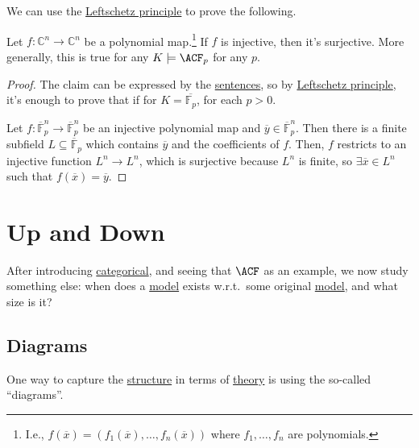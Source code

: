 We can use the \hyperref[thm:Leftschetz-principle]{Leftschetz principle} to prove the following.

\begin{theorem}\label{thm:Ax-Grothendieck}
	Let \(f\colon \mathbb{C} ^n \to \mathbb{C} ^n\) be a polynomial map.\footnote{I.e., \(f(\overline{x} ) = (f_1(\overline{x} ), \ldots , f_n(\overline{x} ))\) where \(f_1, \ldots , f_n\) are polynomials.} If \(f\) is injective, then it's surjective. More generally, this is true for any \(K \models \ACF_p\) for any \(p\).
\end{theorem}
\begin{proof}
	The claim can be expressed by the \hyperref[def:sentence]{sentences}, so by \hyperref[thm:Leftschetz-principle]{Leftschetz principle}, it's enough to prove that if for \(K = \overline{\mathbb{F}_p}\), for each \(p > 0\).

	Let \(f\colon \overline{\mathbb{F}}_p^n \to \overline{\mathbb{F}}_p^n\) be an injective polynomial map and \(\overline{y} \in \overline{\mathbb{F}}_p^n\). Then there is a finite subfield \(L \subseteq \overline{\mathbb{F}} _p \) which contains \(\overline{y}\) and the coefficients of \(f\). Then, \(f\) restricts to an injective function \(L^n \to L^n\), which is surjective because \(L^n\) is finite, so \(\exists \overline{x} \in L^n\) such that \(f(\overline{x} ) = \overline{y} \).
\end{proof}

\section{Up and Down}
After introducing \hyperref[def:categorical]{categorical}, and seeing that \(\ACF\) as an example, we now study something else: when does a \hyperref[def:model]{model} exists w.r.t.\ some original \hyperref[def:model]{model}, and what size is it?

\subsection{Diagrams}
One way to capture the \hyperref[def:structure]{structure} in terms of \hyperref[def:theory]{theory} is using the so-called ``diagrams''.

